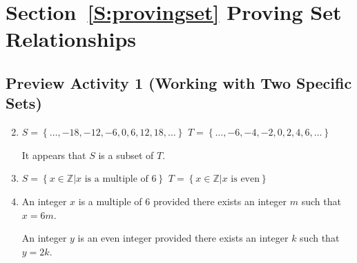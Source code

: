 \section*{Section~\ref{S:provingset} Proving Set Relationships}

\subsection*{Preview Activity 1 (Working with Two Specific Sets)}
\begin{enumerate} \setcounter{enumi}{1}
\item $S = \left\{ { \ldots ,  - 18,  - 12,  - 6, 0, 6, 12, 18,  \ldots } \right\}$ \quad
	$T = \left\{ { \ldots ,  - 6,  - 4,  - 2, 0, 2, 4, 6,  \ldots } \right\}$

It appears that  $S$  is a subset  of  $T$.

\item $S = \left\{ {x \in \mathbb{Z}\left. \right| x\text{ is a multiple of  6}} \right\}$ \quad
	$T = \left\{ {x \in \mathbb{Z}\left. \right| x\text{ is even}} \right\}$


\item An integer  $x$  is a multiple of  6  provided there exists an integer  $m$  such that  
$x = 6m$.

An integer  $y$  is an even integer provided there exists an integer  $k$  such that  
$y = 2k$.


\end{enumerate}
